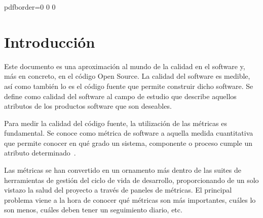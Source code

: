 \documentclass[11pt]{article}
\begin{document}



\renewcommand{\listtablename}{Lista de Tablas}
\renewcommand{\tablename}{TABLA} 

\hypersetup
{   
pdfborder={0 0 0}
}
   
\pagebreak

\tableofcontents
\listoftables
\listoffigures

\pagebreak

\section{Introducción}

Este documento es una aproximación al mundo de la calidad en el software y, más en concreto, en el código Open Source. La calidad del software es medible, así como también lo es el código fuente que permite construir dicho software. Se define como calidad del software al campo de estudio que describe aquellos atributos de los productos software que son deseables.

Para medir la calidad del código fuente, la utilización de las métricas es fundamental. Se conoce como métrica de software a aquella medida cuantitativa que permite conocer en qué grado un sistema, componente o proceso cumple un atributo determinado~\cite{ieeeglossary:softwareengineeringterminology}.

Las métricas se han convertido en un ornamento más dentro de las suites de herramientas de gestión del ciclo de vida de desarrollo, proporcionando de un solo vistazo la salud del proyecto a través de paneles de métricas.
El principal problema viene a la hora de conocer qué métricas son más importantes, cuáles lo son menos, cuáles deben tener un seguimiento diario, etc.~\cite{abistock:usingmetrics}
\end{document}
